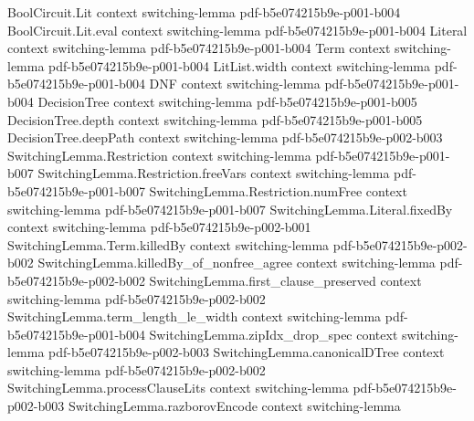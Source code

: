 \begin{lemma}
\label{SwitchingLemma.go_roundtrip}
\leanok
{}
\proofstep
  {BoolCircuit.Lit}
  {context}
  {switching-lemma}
  {pdf-b5e074215b9e-p001-b004}
\proofstep
  {BoolCircuit.Lit.eval}
  {context}
  {switching-lemma}
  {pdf-b5e074215b9e-p001-b004}
\proofstep
  {Literal}
  {context}
  {switching-lemma}
  {pdf-b5e074215b9e-p001-b004}
\proofstep
  {Term}
  {context}
  {switching-lemma}
  {pdf-b5e074215b9e-p001-b004}
\proofstep
  {LitList.width}
  {context}
  {switching-lemma}
  {pdf-b5e074215b9e-p001-b004}
\proofstep
  {DNF}
  {context}
  {switching-lemma}
  {pdf-b5e074215b9e-p001-b004}
\proofstep
  {DecisionTree}
  {context}
  {switching-lemma}
  {pdf-b5e074215b9e-p001-b005}
\proofstep
  {DecisionTree.depth}
  {context}
  {switching-lemma}
  {pdf-b5e074215b9e-p001-b005}
\proofstep
  {DecisionTree.deepPath}
  {context}
  {switching-lemma}
  {pdf-b5e074215b9e-p002-b003}
\proofstep
  {SwitchingLemma.Restriction}
  {context}
  {switching-lemma}
  {pdf-b5e074215b9e-p001-b007}
\proofstep
  {SwitchingLemma.Restriction.freeVars}
  {context}
  {switching-lemma}
  {pdf-b5e074215b9e-p001-b007}
\proofstep
  {SwitchingLemma.Restriction.numFree}
  {context}
  {switching-lemma}
  {pdf-b5e074215b9e-p001-b007}
\proofstep
  {SwitchingLemma.Literal.fixedBy}
  {context}
  {switching-lemma}
  {pdf-b5e074215b9e-p002-b001}
\proofstep
  {SwitchingLemma.Term.killedBy}
  {context}
  {switching-lemma}
  {pdf-b5e074215b9e-p002-b002}
\proofstep
  {SwitchingLemma.killedBy_of_nonfree_agree}
  {context}
  {switching-lemma}
  {pdf-b5e074215b9e-p002-b002}
\proofstep
  {SwitchingLemma.first_clause_preserved}
  {context}
  {switching-lemma}
  {pdf-b5e074215b9e-p002-b002}
\proofstep
  {SwitchingLemma.term_length_le_width}
  {context}
  {switching-lemma}
  {pdf-b5e074215b9e-p001-b004}
\proofstep
  {SwitchingLemma.zipIdx_drop_spec}
  {context}
  {switching-lemma}
  {pdf-b5e074215b9e-p002-b003}
\proofstep
  {SwitchingLemma.canonicalDTree}
  {context}
  {switching-lemma}
  {pdf-b5e074215b9e-p002-b002}
\proofstep
  {SwitchingLemma.processClauseLits}
  {context}
  {switching-lemma}
  {pdf-b5e074215b9e-p002-b003}
\proofstep
  {SwitchingLemma.razborovEncode}
  {context}
  {switching-lemma}

\end{lemma}
